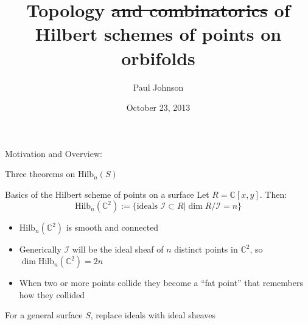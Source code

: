 \documentclass{beamer}
\newcommand{\Hilb}{\textrm{Hilb}}
\newcommand{\C}{\mathbb{C}}
\begin{document}
\title{Topology \sout{and combinatorics} of Hilbert schemes of points on orbifolds}
\author{Paul Johnson}
\date{October 23, 2013}



\newcommand{\stepright}[2]{%
\begin{scope}[xshift=#1cm,yshift=#2cm]
\clip (-.5, -.5)-- ++(1,1) -- ++(1,0) -- ++ (-1,-1) -- ++(-1,0);
\draw[cap=rect] (0,0)--(1,0);
\end{scope}
}
\newcommand{\stepdown}[2]{%
\begin{scope}[xshift=#1cm,yshift=#2cm]
\clip (-.5, -.5)-- ++(1,1) -- ++(0,-1) -- ++ (-1,-1) -- ++(0,1);
\draw[cap=rect] (0,0)--(0,-1);
\end{scope}
}




\begin{frame}[plain]
  \titlepage
\end{frame}


\begin{frame}[plain,c]

\begin{center}

\Huge

 Motivation and Overview:
 
 Three theorems on $\Hilb_n(S)$
\end{center}

\end{frame}




\begin{frame}{Basics of the Hilbert scheme of points on a surface}
Let $R=\C[x,y]$.  Then:
$$\Hilb_n(\C^2):=\{\textrm{ideals }\mathcal{I}\subset R | \dim R/\mathcal{I}=n\}$$ 
\begin{itemize}
\item $\Hilb_n(\C^2)$ is smooth and connected 
\item Generically $\mathcal{I}$ will be the ideal sheaf of $n$ distinct points in $\C^2$, so $\dim \Hilb_n(\C^2)=2n$
\item When two or more points collide they become a ``fat point'' that remembers how they collided
\end{itemize}
For a general surface $S$, replace ideals with ideal sheaves
\end{frame}
\end{document}
